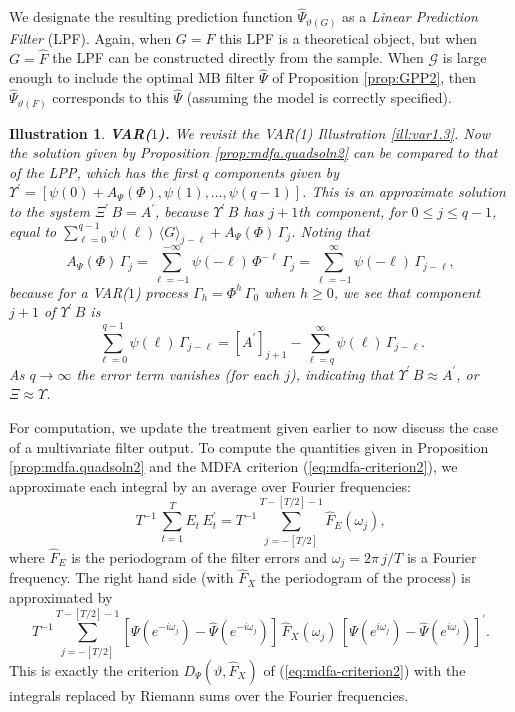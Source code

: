 \documentclass[a4paper]{book}
\def\tends{\rightarrow}
\newtheorem{Illustration}{Illustration}
\begin{document}
 
  We designate the resulting   prediction function
$\widehat{\Psi}_{ {\vartheta} (G)}$  as  a {\em Linear
Prediction Filter} (LPF).   Again, when $G=F$ this LPF is a theoretical
 object, but when $G = \widehat{F}$ the LPF can be constructed directly from the sample.
  When $\mathcal{G}$ is large enough to include the optimal MB filter
 $\widehat{\Psi}  $ of Proposition  \ref{prop:GPP2},  then
 $\widehat{\Psi}_{ {\vartheta} (F)} $ corresponds to  this 
 $\widehat{\Psi}$ (assuming  the model 
 is correctly specified).
 
  

\begin{Illustration} {\bf VAR($1$).}  \rm
\label{ill:var1.3-alt}
  We revisit the VAR(1) Illustration \ref{ill:var1.3}.
  Now  the solution given by Proposition \ref{prop:mdfa.quadsoln2}
 can be compared to that of the LPP, which has the first $q$ components
 given by $  \Upsilon^{\prime} = [ \psi (0) + A_{\Psi} (\Phi), \psi (1),
 \ldots, \psi (q-1)  ]$.
 This is an approximate solution to the system $\Xi^{\prime} \, B
 =  A^{\prime}$, because
 $  \Upsilon^{\prime} \, B $ has $j+1$th component, for $0 \leq j \leq q-1$,
 equal to  $   \sum_{\ell=0}^{q-1} \psi (\ell) \, {\langle G \rangle }_{j-\ell}
 + A_{\Psi} (\Phi) \, \Gamma_j$.  Noting that
\[
 A_{\Psi} (\Phi) \, \Gamma_j
 = \sum_{\ell = -1 }^{-\infty} \psi (-\ell) \, \Phi^{-\ell} \, \Gamma_j
 = \sum_{\ell = -1}^{\infty} \psi (-\ell) \, \Gamma_{j- \ell},
\]
 because for a VAR($1$) process $\Gamma_h = \Phi^h \, \Gamma_0$ when
 $h \geq 0$, we see that component $j+1$ of $\Upsilon^{\prime} \, B$ is
\[
  \sum_{\ell =0 }^{ q-1} \psi (\ell) \, \Gamma_{j-\ell}
  =  {[   A^{\prime} ]}_{j+1} - \sum_{\ell = q}^{\infty} \psi (\ell) \, \Gamma_{j-\ell}.
\]
 As $q \tends \infty$ the error term vanishes (for each $j$), indicating
 that $\Upsilon^{\prime} \, B \approx  A^{\prime}$, or
 $\Xi \approx \Upsilon$.
\end{Illustration}
 
 For computation, we update the treatment given earlier to now discuss the 
 case of a multivariate filter output.
To compute the quantities given in Proposition \ref{prop:mdfa.quadsoln2} and  
the MDFA criterion (\ref{eq:mdfa-criterion2}), we 
approximate each integral by an average over Fourier frequencies: 
\[
  T^{-1} \, \sum_{t=1}^T E_t \, E_t^{\prime} =
  T^{-1} \sum_{j=-[T/2]}^{T-[T/2]-1}   \widehat{F}_{E} (\omega_{j}),
\]
 where $  \widehat{F}_{E}$ is the periodogram of the 
 filter errors and $\omega_j = 2 \pi \, j/T $ is
 a Fourier frequency.   The right hand side
 (with $ \widehat{F}_X$ the periodogram of the process)  is approximated  by 
\[
 T^{-1} \sum_{j=-[T/2]}^{T-[T/2]-1}  \left[ \Psi (e^{-i \omega_{j} }) - \widehat{\Psi} (e^{-i \omega_{j} }) \right] \,
     \widehat{F}_X (\omega_{j}) \,
 {\left[ \Psi (e^{i \omega_{j} }) - \widehat{\Psi}( e^{i \omega_{j} }) \right]}^{\prime}.
\]
   This is exactly the   criterion $D_{\Psi} (\vartheta,  \widehat{F}_X)$ of
 (\ref{eq:mdfa-criterion2}) with the integrals replaced by Riemann
 sums over the Fourier frequencies.
\end{document}
